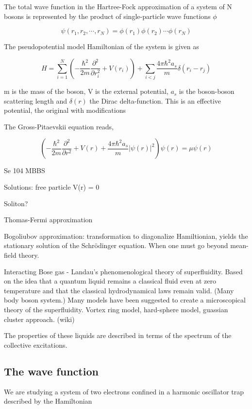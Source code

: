 The total wave function in the Hartree-Fock approximation of a system of N bosons is represented by the product of single-particle wave functions $\phi$

\begin{equation}
\psi(r_1, r_2, \cdots, r_N) = \phi(r_1) \phi(r_2) \cdots \phi(r_N)
\end{equation}

The pseudopotential model Hamiltonian of the system is given as 

\begin{equation}
H = \sum_{i=1}^N \left( -\frac{\hbar^2}{2m} \frac{\partial^2}{\partial r_i^2} + V(r_i) \right) + \sum_{i<j} \frac{4 \pi \hbar^2 a_s}{m} \delta (r_i - r_j)
\end{equation}

m is the mass of the boson, V is the external potential, $a_s$ is the boson-boson scattering length and $\delta(r)$ the Dirac delta-function. This is an effective potential, the original  with modifications 

The Gross-Pitaevskii equation reads, 

\begin{equation}
\left( -\frac{\hbar^2}{2m} \frac{\partial^2}{\partial r^2} + V(r) + \frac{4 \pi \hbar^2 a_s}{m}|\psi(r)|^2 \right) \psi(r) = \mu \psi (r)
\end{equation}

Se 104 MBBS

Solutions: free particle V(r) = 0

Soliton?

Thomas-Fermi approximation

Bogoliubov approximation: transformation to diagonalize Hamiltionian, yields the stationary solution of the Schrödinger equation. When one must go beyond mean-field theory. 

Interacting Bose gas - Landau's phenomenological theory of superfluidity. Based on the idea that a quantum liquid remains a classical fluid even at zero temperature  and that the classical hydrodynamical laws remain valid. (Many body boson system.) 
Many models have been suggested to create a microscopical theory of the superfluidity. Vortex ring model, hard-sphere model, guassian cluster approach. (wiki)

The properties of these liquids are described in terms of the spectrum of the collective excitations.

\subsection{The wave function}
We are studying a system of two electrons confined in a harmonic oscillator trap described by the Hamiltonian 

